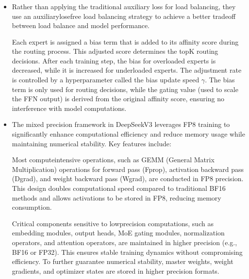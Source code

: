 \documentclass[letterpaper,11pt,english]{sphinxmanual}
\begin{document}
\subsubsection{}
\label{\detokenize{pretraining:training-strategy}}\begin{itemize}
\item {} 
\sphinxAtStartPar
{}

\sphinxAtStartPar
Rather than applying the traditional auxiliary loss for load
balancing, they use an auxiliary\sphinxhyphen{}lose\sphinxhyphen{}free load balancing strategy to
achieve a better trade\sphinxhyphen{}off between load balance and model performance.

\sphinxAtStartPar
Each expert is assigned a bias term that is added to its affinity
score during the routing process. This adjusted score determines the
top\sphinxhyphen{}K routing decisions. After each training step, the bias for
overloaded experts is decreased, while it is increased for underloaded
experts. The adjustment rate is controlled by a hyperparameter called
the bias update speed \(\gamma\). The bias term is only used for
routing decisions, while the gating value (used to scale the FFN
output) is derived from the original affinity score, ensuring no
interference with model computations.

\item {} 
\sphinxAtStartPar
{}

\sphinxAtStartPar
The mixed precision framework in DeepSeek\sphinxhyphen{}V3 leverages FP8 training to
significantly enhance computational efficiency and reduce memory usage
while maintaining numerical stability. Key features include:

\sphinxAtStartPar
Most compute\sphinxhyphen{}intensive operations, such as GEMM (General Matrix
Multiplication) operations for forward pass (Fprop), activation
backward pass (Dgrad), and weight backward pass (Wgrad), are conducted
in FP8 precision. This design doubles computational speed compared to
traditional BF16 methods and allows activations to be stored in FP8,
reducing memory consumption.

\sphinxAtStartPar
Critical components sensitive to low\sphinxhyphen{}precision computations, such as
embedding modules, output heads, MoE gating modules, normalization
operators, and attention operators, are maintained in higher precision
(e.g., BF16 or FP32). This ensures stable training dynamics without
compromising efficiency. To further guarantee numerical stability,
master weights, weight gradients, and optimizer states are stored in
higher precision formats.


\end{itemize}
\end{document}
